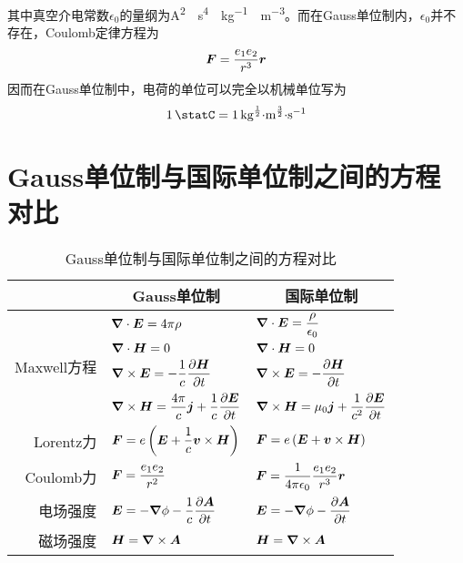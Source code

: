 其中真空介电常数$\epsilon_0$的量纲为\si{\ampere^2\cdot \second^4\cdot \kilo\gram^{-1}\cdot\meter^{-3}}。而在Gauss单位制内，$\epsilon_0$并不存在，Coulomb定律方程为
\begin{equation*}
	\boldsymbol{F} = \frac{e_1e_2}{r^3}\boldsymbol{r}
\end{equation*}
因而在Gauss单位制中，电荷的单位\si{\statC}可以完全以机械单位写为
\begin{equation*}
	\SI{1}{\statC} = \SI{1}{\kilo\gram^{\frac12}\cdot\meter^{\frac32}\cdot\second^{-1}}
\end{equation*}

\section{Gauss单位制与国际单位制之间的方程对比}

\begin{table}[htbp]
  \centering
  \caption{Gauss单位制与国际单位制之间的方程对比}
	\label{Gauss单位制与国际单位制之间的方程对比}
    \begin{tabular}{|r|r|r|}
    \hline
         & \multicolumn{1}{c|}{Gauss单位制} & \multicolumn{1}{c|}{国际单位制} \bigstrut\\
    \hline
    \multirow{4}[2]{*}{Maxwell方程} & \multicolumn{1}{l|}{$\boldsymbol{\nabla} \cdot \boldsymbol{E} = 4\pi\rho$} & \multicolumn{1}{l|}{$\boldsymbol{\nabla} \cdot \boldsymbol{E} = \dfrac{\rho}{\epsilon_0}$} \bigstrut[t]\\
         & \multicolumn{1}{l|}{$\boldsymbol{\nabla} \cdot \boldsymbol{H} = 0$} & \multicolumn{1}{l|}{$\boldsymbol{\nabla} \cdot \boldsymbol{H} = 0$} \\
         & \multicolumn{1}{l|}{$\boldsymbol{\nabla} \times \boldsymbol{E} = -\dfrac1c \dfrac{\partial \boldsymbol{H}}{\partial t}$} & \multicolumn{1}{l|}{$\boldsymbol{\nabla} \times \boldsymbol{E} = -\dfrac{\partial \boldsymbol{H}}{\partial t}$} \\
         & \multicolumn{1}{l|}{$\boldsymbol{\nabla} \times \boldsymbol{H} = \dfrac{4\pi}{c}\boldsymbol{j}+\dfrac1c \dfrac{\partial \boldsymbol{E}}{\partial t}$} & \multicolumn{1}{l|}{$\boldsymbol{\nabla} \times \boldsymbol{H} = \mu_0\boldsymbol{j}+\dfrac{1}{c^2} \dfrac{\partial \boldsymbol{E}}{\partial t}$} \bigstrut[b]\\
    \hline
    Lorentz力 & \multicolumn{1}{l|}{$\boldsymbol{F}=e\left(\boldsymbol{E}+\dfrac1c\boldsymbol{v}\times \boldsymbol{H}\right)$} & \multicolumn{1}{l|}{$\boldsymbol{F}=e\left(\boldsymbol{E}+\boldsymbol{v}\times \boldsymbol{H}\right)$} \bigstrut\\
    \hline
    Coulomb力 & \multicolumn{1}{l|}{$\boldsymbol{F} = \dfrac{e_1e_2}{r^2}$} & \multicolumn{1}{l|}{$\boldsymbol{F} = \dfrac{1}{4\pi\epsilon_0} \dfrac{e_1e_2}{r^3}\boldsymbol{r}$} \bigstrut\\
    \hline
    电场强度 & \multicolumn{1}{l|}{$\boldsymbol{E} = -\boldsymbol{\nabla}\phi-\dfrac1c\dfrac{\partial \boldsymbol{A}}{\partial t}$} & \multicolumn{1}{l|}{$\boldsymbol{E} = -\boldsymbol{\nabla}\phi-\dfrac{\partial \boldsymbol{A}}{\partial t}$} \bigstrut\\
    \hline
    磁场强度 & \multicolumn{1}{l|}{$\boldsymbol{H} = \boldsymbol{\nabla}\times \boldsymbol{A}$} & \multicolumn{1}{l|}{$\boldsymbol{H} = \boldsymbol{\nabla}\times \boldsymbol{A}$} \bigstrut\\
    \hline
    \end{tabular}%
\end{table}%

